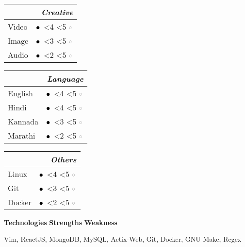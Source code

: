 \documentclass[12pt, a4paper]{article}
\newcommand{\openbullet}{\ensuremath{\circ}}%
\newcommand{\solidbullet}{\ensuremath{\bullet}}%
\newcounter{counter_skilllevel}%
\newcommand{\level}[1]{%
    \setcounter{counter_skilllevel}{0}%
    \loop%
        \textcolor{black}{\Large\solidbullet}\,%
        \stepcounter{counter_skilllevel}%
        \ifnum \value{counter_skilllevel}<#1%
    \repeat%
    \loop%
        \ifnum \value{counter_skilllevel}<5%
        \stepcounter{counter_skilllevel}%
        \textcolor{darkgray}{\Large\openbullet}\,%
    \repeat%
}
\begin{document}
\begin{multicols}{2}
{\begin{multicols}{2}
\begin{table}[H]
\begin{tabular}[c]{ll}
								\multicolumn{2}{r}{\slshape\bfseries Creative}\\
								\toprule
								\footnotesize Video & \level{4} \\
								\footnotesize Image & \level{3} \\
								\footnotesize Audio & \level{2} \\
							\end{tabular}
					\end{table}
					\begin{table}[H]
						\label{tab:}
						\raggedleft
							\begin{tabular}[c]{ll}
								\multicolumn{2}{r}{\slshape\bfseries Language}\\
								\toprule
								\footnotesize English & \level{4} \\
								\footnotesize Hindi & \level{4} \\
								\footnotesize Kannada & \level{3} \\
								\footnotesize Marathi & \level{2} \\
							\end{tabular}
					\end{table}
					\begin{table}[H]
						\label{tab:}
						\raggedleft
							\begin{tabular}[c]{ll}
								\multicolumn{2}{r}{\slshape\bfseries Others}\\
								\toprule
								\footnotesize Linux & \level{4} \\
								\footnotesize Git & \level{3} \\
								\footnotesize Docker & \level{2} \\
							\end{tabular}
					\end{table}
				\end{multicols}
				}
				{\large\bfseries Technologies}
				{\large\bfseries Strengths}
				{\large\bfseries Weakness}
				
				\parbox{10em}{Vim, ReactJS, MongoDB, MySQL, Actix-Web, Git, Docker, GNU Make, Regex}
	\end{multicols}
\end{document}
